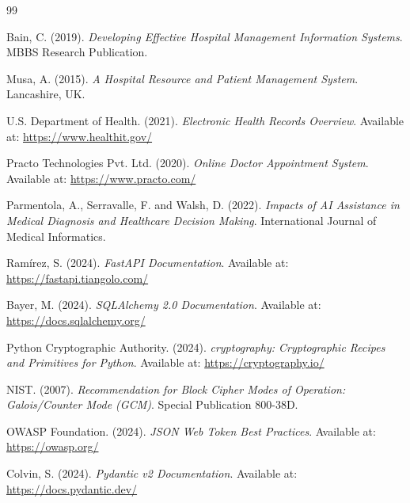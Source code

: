 \documentclass[a4paper,12pt]{report}
\begin{document}
\begin{thebibliography}{99}

Bain, C. (2019). \textit{Developing Effective Hospital Management Information Systems}. MBBS Research Publication.

Musa, A. (2015). \textit{A Hospital Resource and Patient Management System}. Lancashire, UK.

U.S. Department of Health. (2021). \textit{Electronic Health Records Overview}. Available at: \url{https://www.healthit.gov/}

Practo Technologies Pvt. Ltd. (2020). \textit{Online Doctor Appointment System}. Available at: \url{https://www.practo.com/}

Parmentola, A., Serravalle, F. and Walsh, D. (2022). \textit{Impacts of AI Assistance in Medical Diagnosis and Healthcare Decision Making}. International Journal of Medical Informatics.

Ramírez, S. (2024). \textit{FastAPI Documentation}. Available at: \url{https://fastapi.tiangolo.com/}

Bayer, M. (2024). \textit{SQLAlchemy 2.0 Documentation}. Available at: \url{https://docs.sqlalchemy.org/}

Python Cryptographic Authority. (2024). \textit{cryptography: Cryptographic Recipes and Primitives for Python}. Available at: \url{https://cryptography.io/}

NIST. (2007). \textit{Recommendation for Block Cipher Modes of Operation: Galois/Counter Mode (GCM)}. Special Publication 800-38D.

OWASP Foundation. (2024). \textit{JSON Web Token Best Practices}. Available at: \url{https://owasp.org/}

Colvin, S. (2024). \textit{Pydantic v2 Documentation}. Available at: \url{https://docs.pydantic.dev/}

\end{thebibliography}
\end{document}
